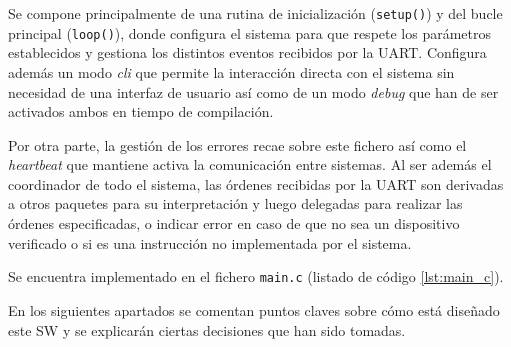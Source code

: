 \begin{itemize}
    Se compone principalmente de una rutina de inicialización (\texttt{setup()})
    y del bucle principal (\texttt{loop()}), donde configura el sistema para que
    respete los parámetros establecidos y gestiona los distintos eventos recibidos
    por la \ac{UART}. Configura además un modo \textit{cli} que permite la interacción
    directa con el sistema sin necesidad de una interfaz de usuario así como de un
    modo \textit{debug} que han de ser activados ambos en tiempo de compilación.

    Por otra parte, la gestión de los errores recae sobre este fichero así como
    el \textit{heartbeat} que mantiene activa la comunicación entre sistemas. Al ser
    además el coordinador de todo el sistema, las órdenes recibidas por la \ac{UART}
    son derivadas a otros paquetes para su interpretación y luego delegadas para
    realizar las órdenes especificadas, o indicar error en caso de que no sea un
    dispositivo verificado o si es una instrucción no implementada por el sistema.

    Se encuentra implementado en el fichero \texttt{main.c} (listado de código
    \ref{lst:main_c}).
\end{itemize}

En los siguientes apartados se comentan puntos claves sobre cómo está diseñado este
\ac{SW} y se explicarán ciertas decisiones que han sido tomadas.

